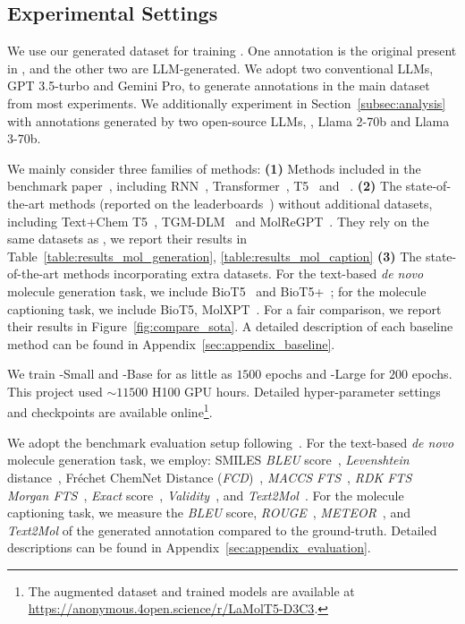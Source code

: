 \subsection{Experimental Settings}
\label{subsec:experimental_settings}

We use our generated \newdataset dataset for training \newmodel.
One annotation is the original present in \olddataset, and the other two are LLM-generated.
We adopt two conventional LLMs, GPT 3.5-turbo and Gemini Pro, to generate annotations in the main dataset from most experiments. 
We additionally experiment in Section~\ref{subsec:analysis} with annotations generated by two open-source LLMs, \eg, Llama 2-70b and Llama 3-70b. 

We mainly consider three families of methods: 
\textbf{(1)} Methods included in the benchmark paper~\cite{ELRHCJ22}, including RNN~\cite{CMGBBSB14}, Transformer~\cite{VSPUJGKP17}, T5~\cite{RSRLNMZLL20} and \oldmodel~\cite{ELRHCJ22}. 
\textbf{(2)} The state-of-the-art methods (reported on the leaderboards~\cite{denovo,captioning}) without additional datasets, including Text+Chem T5~\cite{CGBWLM23}, TGM-DLM~\cite{GLWW24} and MolReGPT~\cite{LLFWLTL24}. 
They rely on the same datasets as \newmodel, we report their results in Table~\ref{table:results_mol_generation}, \ref{table:results_mol_caption}
\textbf{(3)} The state-of-the-art methods incorporating extra datasets. 
For the text-based \emph{de novo} molecule generation task, we include BioT5~\cite{PZZWGWXY23} and BioT5+~\cite{PWGLFZXQY24}; for the molecule captioning task, we include BioT5, MolXPT~\cite{LZXWXQZL23}. 
For a fair comparison, we report their results in Figure~\ref{fig:compare_sota}. 
% 
A detailed description of each baseline method can be found in Appendix~\ref{sec:appendix_baseline}.

We train \newmodel-Small and -Base for as little as $1500$ epochs and \newmodel-Large for $200$ epochs. 
This project used $\sim11500$ H100 GPU hours. 
Detailed hyper-parameter settings and checkpoints are available online\footnote{The augmented dataset and trained models are available at \url{https://anonymous.4open.science/r/LaMolT5-D3C3}.}. 

We adopt the benchmark evaluation setup following~\cite{ELRHCJ22}. 
For the text-based \emph{de novo} molecule generation task, we employ: SMILES \emph{BLEU} score~\cite{PRWZ02}, \emph{Levenshtein} distance~\cite{MVM09}, Fréchet ChemNet Distance (\emph{FCD})~\cite{PRUHK18}, \emph{MACCS FTS}~\cite{DLHN02}, \emph{RDK FTS}~\cite{SSL15} \emph{Morgan FTS}~\cite{RH10}, \emph{Exact} score~\cite{ELRHCJ22}, \emph{Validity}~\cite{ELRHCJ22}, and \emph{Text2Mol}~\cite{EZJ21}. 
For the molecule captioning task, we measure the \emph{BLEU} score, \emph{ROUGE}~\cite{L04}, \emph{METEOR}~\cite{BL05}, and \emph{Text2Mol} of the generated annotation compared to the ground-truth. 
Detailed descriptions can be found in Appendix~\ref{sec:appendix_evaluation}.

